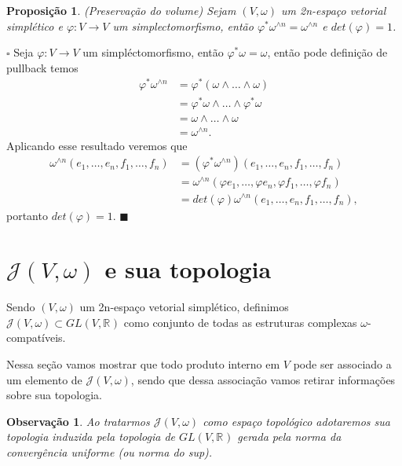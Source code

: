 \documentclass[12pt]{book}
\newtheorem{observacao}[teorema]{Observação}
\newtheorem{proposicao}[teorema]{Proposição}
\newenvironment{prova}[1]{$\square$ #1}{\hfill$\blacksquare$}
\newcommand{\estruturascomplexaspadrao}{\mathcal{J}(V, \omega)}
\newcommand{\generalgroup}[2]{GL(#1, #2)}
\newcommand{\generalgroupreal}[1]{\generalgroup{#1}{\real{}}}
\newcommand{\real}[1]{\mathbb{R}^{#1}}
\begin{document}
	\begin{proposicao}\label{proposicao_preservacao_volume}
		(Preservação do volume) Sejam $(V,\omega)$ um 2n-espaço vetorial simplético e $\varphi:V\to V$ um simplectomorfismo, então $\varphi^{*}\omega^{\wedge n}=\omega^{\wedge n}$ e $det(\varphi)=1$.
	\end{proposicao}
	\begin{prova}
		Seja $\varphi:V \to V$ um simpléctomorfismo, então $\varphi^{*}\omega = \omega$, então pode definição de pullback temos
		$$
		\begin{aligned}
		\varphi^{*}\omega^{\wedge n} 
		&= 
		\varphi^{*}(\omega\wedge \dots \wedge\omega) 
		\\
		&= \varphi^{*}\omega\wedge \dots \wedge\varphi^{*}\omega
		\\
		&=\omega\wedge \dots \wedge \omega 
		\\
		&= \omega^{\wedge n}.
		\end{aligned} 
		$$
		Aplicando esse resultado veremos que
		$$
		\begin{aligned}
		\omega^{\wedge n}(e_{1}, \dots,e_{n}, f_{1},\dots, f_{n})
		&=(\varphi^{*}\omega^{\wedge n})(e_{1}, \dots, e_{n}, f_{1},\dots, f_{n})
		\\
		&=
		\omega^{\wedge n}(\varphi e_{1}, \dots,\varphi  e_{n}, \varphi f_{1},\dots, \varphi f_{n})
		\\
		&=det(\varphi)\omega^{\wedge n}(e_{1}, \dots, e_{n}, f_{1},\dots, f_{n}),
		\end{aligned}
		$$
		portanto $det(\varphi) = 1$.
	\end{prova}
	
	\section{$\estruturascomplexaspadrao$ e sua topologia}
	
	Sendo $(V,\omega)$ um 2n-espaço vetorial simplético, definimos $\estruturascomplexaspadrao \subset \generalgroupreal{V}$ como conjunto de todas as estruturas complexas $\omega$-compatíveis.
	
	Nessa seção vamos mostrar que todo produto interno em $V$ pode ser associado a um elemento de $\estruturascomplexaspadrao$, sendo que dessa associação vamos retirar informações sobre sua topologia.
	
	\begin{observacao}\label{observacao_conjunto_estrutura_complexa}
		Ao tratarmos $\estruturascomplexaspadrao$ como espaço topológico adotaremos sua topologia induzida pela topologia de $\generalgroupreal{V}$ gerada pela norma da convergência uniforme (ou norma do sup).
	\end{observacao}
	
\end{document}
